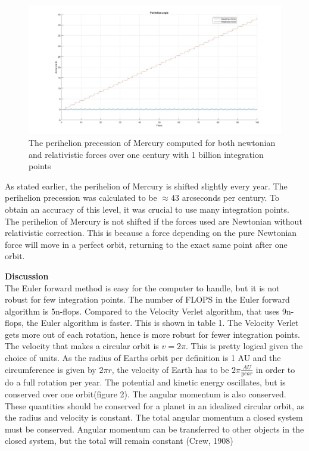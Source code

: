\documentclass[10pt,a4paper]{article}
\begin{document}
\begin{figure} [H]
\centerline{\includegraphics[scale=0.3]{perihelion.jpg}}
\caption{The perihelion precession of Mercury computed for both newtonian and relativistic forces over one century with 1 billion integration points}
\end{figure} 
\noindent As stated earlier, the perihelion of Mercury is shifted slightly every year. The perihelion precession was calculated to be $\approx 43$ arcseconds per century. To obtain an accuracy of this level, it was crucial to use many integration points. The perihelion of Mercury is not shifted if the forces used are Newtonian without relativistic correction. This is because a force depending on the pure Newtonian force will move in a perfect orbit, returning to the exact same point after one orbit. 


\newpage
{\LARGE\bf
Discussion
}
\\


\noindent The Euler forward method is easy for the computer to handle, but it is not robust for few integration points. The number of FLOPS in the Euler forward algorithm is 5n-flops. Compared to the Velocity Verlet algorithm, that uses 9n-flops, the Euler algorithm is faster. This is shown in table 1. The Velocity Verlet gets more out of each rotation, hence is more robust for fewer integration points. The velocity that makes a circular orbit is $v=2\pi$. This is pretty logical given the choice of units. As the radius of Earths orbit per definition is 1 AU and the circumference is given by $2\pi r$, the velocity of Earth has to be $2\pi \frac{AU}{year}$ in order to do a full rotation per year. The potential and kinetic energy oscillates, but is conserved over one orbit(figure 2). The angular momentum is also conserved. These quantities should be conserved for a planet in an idealized circular orbit, as the radius and velocity is constant. The total angular momentum a closed system must be conserved. Angular momentum can be transferred to other objects in the closed system, but the total will remain constant (Crew, 1908) \\
\end{document}
